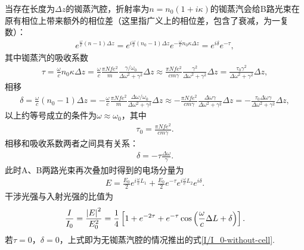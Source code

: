 \documentclass{assignment}
\begin{document}
当存在长度为$\Delta z$的铷蒸汽腔，折射率为$n=n_0(1+i\kappa)$的铷蒸汽会给B路光束在原有相位上带来额外的相位差（这里指广义上的相位差，包含了衰减，为一复数）：
\begin{align}
    e^{\frac{\omega}{c}(n-1)\Delta z}=e^{i\frac{\omega}{c}(n_0-1)\Delta z}e^{-\frac{\omega}{c}n_0\kappa\Delta z}=e^{i\delta}e^{-\tau},
\end{align}
其中铷蒸汽的吸收系数
\begin{align}
    \tau=\frac{\omega}{c}n_0\kappa\Delta z=\frac{\omega}{c}\frac{\pi Nfe^2}{m}\frac{\gamma/\omega_0}{\Delta\omega^2+\gamma^2}\Delta z\approx\frac{\pi Nfe^2}{cm\gamma}\frac{\gamma^2}{\Delta\omega^2+\gamma^2}\Delta z=\frac{\tau_0\gamma^2}{\Delta\omega^2+\gamma^2}\Delta z,
\end{align}
相移
\begin{align}
    \delta=\frac{\omega}{c}(n_0-1)\Delta z=-\frac{\omega}{c}\frac{\pi Nfe^2}{m}\frac{\Delta\omega/\omega_0}{\Delta\omega^2+\gamma^2}\Delta z\approx-\frac{\pi Nfe^2}{cm\gamma}\frac{\Delta\omega\gamma}{\Delta\omega^2+\gamma^2}\Delta z=-\frac{\tau_0\Delta\omega\gamma}{\Delta\omega^2+\gamma^2}\Delta z,
\end{align}
以上约等号成立的条件为$\omega\approx\omega_0$，其中
\begin{align}
    \tau_0=\frac{\pi Nfe^2}{cm\gamma}.
\end{align}
相移和吸收系数两者之间具有关系：
\begin{align}
    \delta=-\tau\frac{\Delta\omega}{\gamma}.
\end{align}
此时A、B两路光束再次叠加时得到的电场分量为
\begin{align}
    E=\frac{E_0}{2}e^{i\frac{\omega}{c}L_1}+\frac{E_0}{2}e^{-\tau}e^{i\frac{\omega}{c}L_2}e^{i\delta}.
\end{align}
干涉光强与入射光强的比值为
\begin{align}
    \frac{I}{I_0}=\frac{\left\lvert E\right\rvert^2}{E_0^2}=\frac{1}{4}\left[1+e^{-2\tau}+e^{-\tau}\cos\left(\frac{\omega}{c}\Delta L+\delta\right)\right].
\end{align}
若$\tau=0$，$\delta=0$，上式即为无铷蒸汽腔的情况推出的式\eqref{I/I_0-without-cell}.
\end{document}
